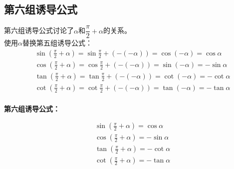 \documentclass[UTF8]{ctexart}
\begin{document}
\subsection{第六组诱导公式}
    第六组诱导公式讨论了$\alpha$和$\dfrac{\pi}{2}+\alpha$的关系。\\[4mm]
    使用$\alpha$替换第五组诱导公式：
    \setcounter{equation}{0}
    \begin{align}
        &\sin{\left(\frac{\pi}{2}+\alpha\right)}=\sin{\frac{\pi}{2}+\left(-(-\alpha)\right)}=\cos{(-\alpha)}=\cos{\alpha}\\[3mm]
        &\cos{\left(\frac{\pi}{2}+\alpha\right)}=\cos{\frac{\pi}{2}+\left(-(-\alpha)\right)}=\sin{(-\alpha)}=-\sin{\alpha}\\[3mm]
        &\tan{\left(\frac{\pi}{2}+\alpha\right)}=\tan{\frac{\pi}{2}+\left(-(-\alpha)\right)}=\cot{(-\alpha)}=-\cot{\alpha}\\[3mm]
        &\cot{\left(\frac{\pi}{2}+\alpha\right)}=\cot{\frac{\pi}{2}+\left(-(-\alpha)\right)}=\tan{(-\alpha)}=-\tan{\alpha}
    \end{align}\\[3mm]
    \textbf{第六组诱导公式：}
    \begin{large}
    \begin{align*}
        &\sin{\left(\frac{\pi}{2}+\alpha\right)}=\cos{\alpha}\\[4mm]
        &\cos{\left(\frac{\pi}{2}+\alpha\right)}=-\sin{\alpha}\\[4mm]
        &\tan{\left(\frac{\pi}{2}+\alpha\right)}=-\cot{\alpha}\\[4mm]
        &\cot{\left(\frac{\pi}{2}+\alpha\right)}=-\tan{\alpha}
    \end{align*}        
    \end{large}

\newpage
\end{document}
